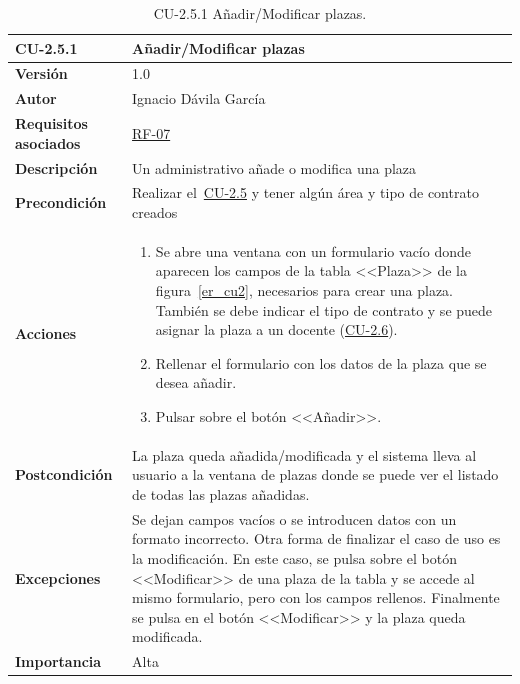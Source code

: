 \begin{table}[p]
	\label{table:CU-2.5.1}
	\centering
	\begin{tabularx}{\linewidth}{ p{} p{} }
		\toprule
		\textbf{CU-2.5.1}    & \textbf{Añadir/Modificar plazas}\\
		\toprule
		\textbf{Versión}              & 1.0    \\
		\textbf{Autor}                & Ignacio Dávila García \\
		\textbf{Requisitos asociados} & \hyperref[itm:RF7]{RF-07} \\
		\textbf{Descripción}          & Un administrativo añade o modifica una plaza \\
		\textbf{Precondición}         & Realizar el~\hyperref[table:CU-2.5]{CU-2.5} y tener algún área y tipo de contrato creados \\
		\textbf{Acciones}             &
		\begin{enumerate}
			\def\labelenumi{\arabic{enumi}.}
			\tightlist
			\item Se abre una ventana con un formulario vacío donde aparecen los campos de la tabla <<Plaza>> de la figura~\ref{er_cu2}, necesarios para crear una plaza. También se debe indicar el tipo de contrato y se puede asignar la plaza a un docente (\hyperref[table:CU-2.6]{CU-2.6}).
			\item Rellenar el formulario con los datos de la plaza que se desea añadir.
			\item Pulsar sobre el botón <<Añadir>>.
		\end{enumerate}\\
		\textbf{Postcondición}        & La plaza queda añadida/modificada y el sistema lleva al usuario a la ventana de plazas donde se puede ver el listado de todas las plazas añadidas. \\
		\textbf{Excepciones}          & Se dejan campos vacíos o se introducen datos con un formato incorrecto. Otra forma de finalizar el caso de uso es la modificación. En este caso, se pulsa sobre el botón <<Modificar>> de una plaza de la tabla y se accede al mismo formulario, pero con los campos rellenos. Finalmente se pulsa en el botón <<Modificar>> y la plaza queda modificada. \\
		\textbf{Importancia}          & Alta \\
		\bottomrule
	\end{tabularx}
	\caption{CU-2.5.1 Añadir/Modificar plazas.}
\end{table}
\FloatBarrier

